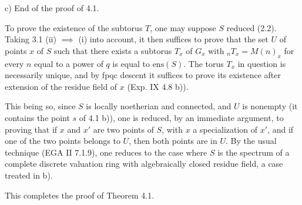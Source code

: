 \noindent c) End of the proof of 4.1.

To prove the existence of the subtorus $T$, one may suppose $S$ reduced (2.2). Taking 3.1 (ii) $\implies$ (i) into account, it then suffices to prove that the set $U$ of points $x$ of $S$ such that there exists a subtorus $T_x$ of $G_x$ with ${}_nT_x=M(n)_x$ for every $n$ equal to a power of $q$ is equal to $\mathrm{ens}(S)$. The torus $T_x$ in question is necessarily unique, and by fpqc descent it suffices to prove its existence after extension of the residue field of $x$ (Exp. IX 4.8 b)).

This being so, since $S$ is locally noetherian and connected, and $U$ is nonempty (it contains the point $s$ of 4.1 b)), one is reduced, by an immediate argument, to proving that if $x$ and $x'$ are two points of $S$, with $x$ a specialization of $x'$, and if one of the two points belongs to $U$, then both points are in $U$. By the usual technique (EGA II 7.1.9), one reduces to the case where $S$ is the spectrum of a complete discrete valuation ring with algebraically closed residue field, a case treated in b).

This completes the proof of Theorem 4.1.

